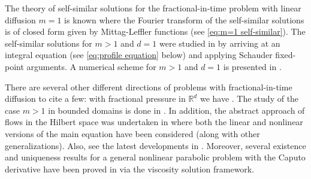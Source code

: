 \documentclass[a4paper]{article}
\theoremstyle{definition}
\begin{document}
\medskip


The theory of self-similar solutions for the fractional-in-time problem with linear diffusion $m = 1$ is known \cite{MR1061448, MR2047909,MR3631303} where the Fourier transform of the self-similar solutions is of closed form given by Mittag-Leffler functions (see \eqref{eq:m=1 self-similar}). 
The self-similar solutions for $m > 1$ and $d=1$ were studied in \cite{CaballeroOkrasinska-PlociniczakPlociniczakSadarangani2025} by arriving at an integral equation (see \eqref{eq:profile equation} below) and applying Schauder fixed-point arguments. 
A numerical scheme for $m > 1$ and $d=1$ is presented in \cite{Plociniczak2019}.

\medskip

There are several other different directions of problems with fractional-in-time diffusion to cite a few:
with fractional pressure in $\mathbb R^d$ we have \cite{allen2016}.
The study of the case $m > 1$ in bounded domains is done in \cite{bonforteTimeFractionalPorousMedium2024}.
In addition, the abstract approach of flows in the Hilbert space was undertaken in \cite{akagi2019fractional} where both the linear and nonlinear versions of the main equation have been considered (along with other generalizations). 
Also, see the latest developments in \cite{akagi2025time}. 
Moreover, several existence and uniqueness results for a general nonlinear parabolic problem with the Caputo derivative have been proved in \cite{topp2017existence} via the viscosity solution framework. 
\end{document}
